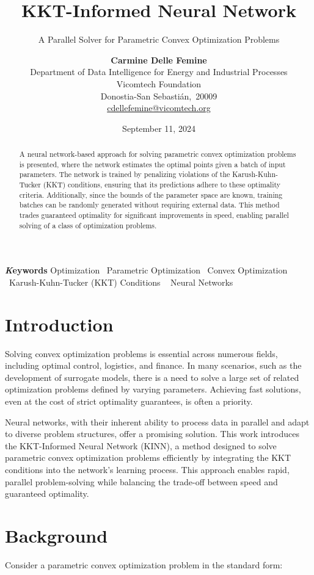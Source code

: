 \documentclass[
]{article}
\title{KKT-Informed Neural Network}
\subtitle{A Parallel Solver for Parametric Convex Optimization Problems}
\author{\textbf{Carmine Delle Femine}\\Department of Data Intelligence
for Energy and Industrial Processes\\Vicomtech Foundation\\Donostia-San
Sebastián,\ 20009\\\href{mailto:cdellefemine@vicomtech.org}{cdellefemine@vicomtech.org}}
\date{September 11, 2024}
\begin{document}
\maketitle
\begin{abstract}
A neural network-based approach for solving parametric convex
optimization problems is presented, where the network estimates the
optimal points given a batch of input parameters. The network is trained
by penalizing violations of the Karush-Kuhn-Tucker (KKT) conditions,
ensuring that its predictions adhere to these optimality criteria.
Additionally, since the bounds of the parameter space are known,
training batches can be randomly generated without requiring external
data. This method trades guaranteed optimality for significant
improvements in speed, enabling parallel solving of a class of
optimization problems.
\end{abstract}
{\bfseries \emph Keywords}
\def\sep{\textbullet\ }
Optimization \sep Parametric Optimization \sep Convex
Optimization \sep Karush-Kuhn-Tucker (KKT) Conditions \sep 
Neural Networks


\section{Introduction}\label{introduction}

Solving convex optimization problems is essential across numerous
fields, including optimal control, logistics, and finance. In many
scenarios, such as the development of surrogate models, there is a need
to solve a large set of related optimization problems defined by varying
parameters. Achieving fast solutions, even at the cost of strict
optimality guarantees, is often a priority.

Neural networks, with their inherent ability to process data in parallel
and adapt to diverse problem structures, offer a promising solution.
This work introduces the KKT-Informed Neural Network (KINN), a method
designed to solve parametric convex optimization problems efficiently by
integrating the KKT conditions into the network's learning process. This
approach enables rapid, parallel problem-solving while balancing the
trade-off between speed and guaranteed optimality.

\section{Background}\label{background}

Consider a parametric convex optimization problem in the standard form:
\end{document}
